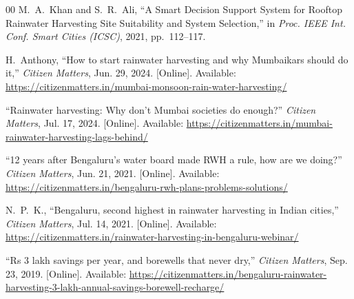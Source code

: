 \documentclass[conference]{IEEEtran}
\begin{document}
\begin{thebibliography}{00}
M.~A.~Khan and S.~R.~Ali, ``A Smart Decision Support System for Rooftop Rainwater Harvesting Site Suitability and System Selection,'' in \textit{Proc. IEEE Int. Conf. Smart Cities (ICSC)}, 2021, pp.~112--117.

H.~Anthony, ``How to start rainwater harvesting and why Mumbaikars should do it,'' \textit{Citizen Matters}, Jun. 29, 2024. [Online]. Available: \url{https://citizenmatters.in/mumbai-monsoon-rain-water-harvesting/}

``Rainwater harvesting: Why don't Mumbai societies do enough?'' \textit{Citizen Matters}, Jul. 17, 2024. [Online]. Available: \url{https://citizenmatters.in/mumbai-rainwater-harvesting-lags-behind/}

``12 years after Bengaluru's water board made RWH a rule, how are we doing?'' \textit{Citizen Matters}, Jun. 21, 2021. [Online]. Available: \url{https://citizenmatters.in/bengaluru-rwh-plans-problems-solutions/}

N.~P.~K., ``Bengaluru, second highest in rainwater harvesting in Indian cities,'' \textit{Citizen Matters}, Jul. 14, 2021. [Online]. Available: \url{https://citizenmatters.in/rainwater-harvesting-in-bengaluru-webinar/}

``Rs 3 lakh savings per year, and borewells that never dry,'' \textit{Citizen Matters}, Sep. 23, 2019. [Online]. Available: \url{https://citizenmatters.in/bengaluru-rainwater-harvesting-3-lakh-annual-savings-borewell-recharge/}

\end{thebibliography}
\end{document}
